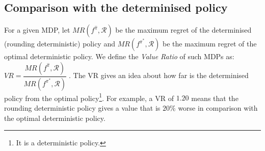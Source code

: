

%



 
  
  

\subsection{Comparison with the determinised policy}

For a given MDP, let $MR(f^{\hat{\pi}}, \mathcal{R})$ be the maximum regret of the determinised  (rounding deterministic) policy and $MR(f^{\pi^*}, \mathcal{R})$  be the maximum regret of the optimal deterministic policy. We define the \textit{Value Ratio} of such MDPs as: $VR = \dfrac{MR(f^{\hat{\pi}}, \mathcal{R})}{MR(f^{\pi^*}, \mathcal{R})}\;$.
The VR gives an idea about how far is the determinised policy from the optimal policy\footnote{ It is a deterministic policy.}. 
For example, a VR of $1.20$ means that the rounding deterministic policy gives a value that is $20\%$ worse in comparison with the optimal deterministic policy. 
%

